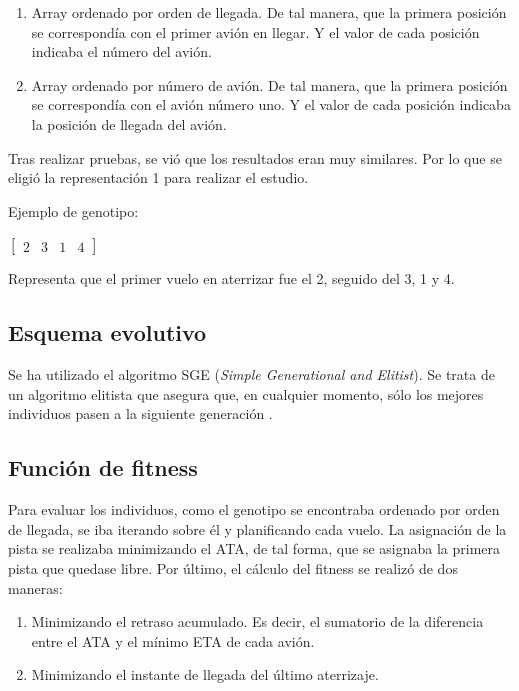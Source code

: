 \documentclass[a4paper,12pt,titlepage]{article}
\begin{document}
\begin{enumerate}[noitemsep]
	\item Array ordenado por orden de llegada. De tal manera, que la primera posición se correspondía con el primer avión en llegar. Y el valor de cada posición indicaba el número del avión.
	\item Array ordenado por número de avión. De tal manera, que la primera posición se correspondía con el avión número uno. Y el valor de cada posición indicaba la posición de llegada del avión.
\end{enumerate}

Tras realizar pruebas, se vió que los resultados eran muy similares. Por lo que se eligió la representación 1 para realizar el estudio.

Ejemplo de genotipo:

\begin{center}
$
\begin{bmatrix}
	2 & 3 & 1 & 4
\end{bmatrix}
$
\end{center}

Representa que el primer vuelo en aterrizar fue el 2, seguido del 3, 1 y 4.

\subsection{Esquema evolutivo}

Se ha utilizado el algoritmo SGE (\textit{Simple Generational and Elitist}). Se trata de un algoritmo elitista que asegura que, en cualquier momento, sólo los mejores individuos pasen a la siguiente generación \citep{jclec:sge}.

\subsection{Función de fitness}

Para evaluar los individuos, como el genotipo se encontraba ordenado por orden de llegada, se iba iterando sobre él y planificando cada vuelo. La asignación de la pista se realizaba minimizando el ATA, de tal forma, que se asignaba la primera pista que quedase libre. Por último, el cálculo del fitness se realizó de dos maneras:

\begin{enumerate}[noitemsep]
	\item Minimizando el retraso acumulado. Es decir, el sumatorio de la diferencia entre el ATA y el mínimo ETA de cada avión.
	\item Minimizando el instante de llegada del último aterrizaje.
\end{enumerate}
\end{document}
